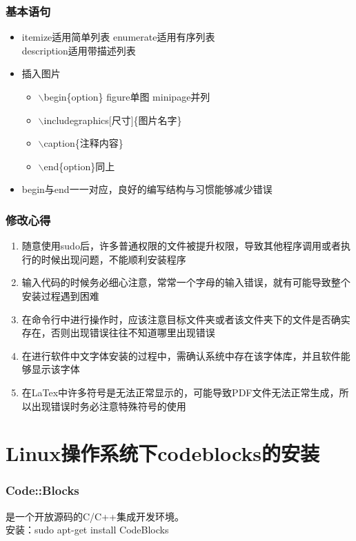 \documentclass[notheorems,mathserif,table,compress]{beamer}  %
\begin{document}
\begin{frame}
  \frametitle{基本语句}
  \begin{itemize}
  \item itemize适用简单列表   enumerate适用有序列表   \\
        description适用带描述列表
  \item  插入图片
    \begin{itemize}
    \item $\backslash$begin\{option\} figure单图 minipage并列
    \item $\backslash$includegraphics[尺寸]\{图片名字\}
    \item $\backslash$caption\{注释内容\}
    \item $\backslash$end\{option\}同上
    \end{itemize}
  \item begin与end一一对应，良好的编写结构与习惯能够减少错误
  \end{itemize}
\end{frame}

\begin{frame} 
\frametitle{修改心得}
  \begin{enumerate}
  \item 随意使用sudo后，许多普通权限的文件被提升权限，导致其他程序调用或者执行的时候出现问题，不能顺利安装程序
  \item 输入代码的时候务必细心注意，常常一个字母的输入错误，就有可能导致整个安装过程遇到困难
  \item 在命令行中进行操作时，应该注意目标文件夹或者该文件夹下的文件是否确实存在，否则出现错误往往不知道哪里出现错误
  \item 在进行软件中文字体安装的过程中，需确认系统中存在该字体库，并且软件能够显示该字体
  \item 在LaTex中许多符号是无法正常显示的，可能导致PDF文件无法正常生成，所以出现错误时务必注意特殊符号的使用
  \end{enumerate}
\end {frame}

\section{Linux操作系统下codeblocks的安装}

\begin{frame}
  \frametitle{Code::Blocks}
  是一个开放源码的C/C++集成开发环境。\\
  安装：sudo apt-get install CodeBlocks
\end{frame}
\end{document}
